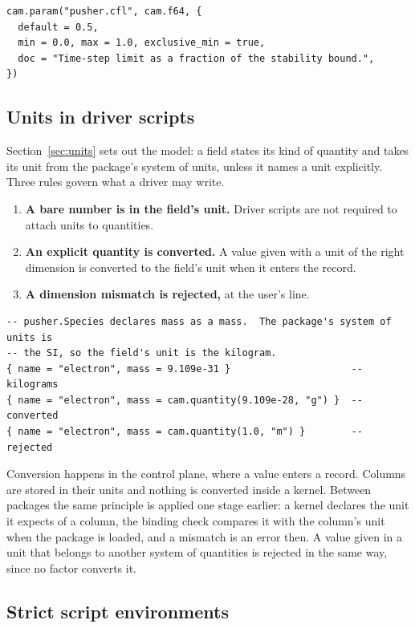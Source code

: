 \documentclass[11pt,a4paper]{article}
\begin{document}
\begin{lstlisting}[language={[5.3]Lua}]
cam.param("pusher.cfl", cam.f64, {
  default = 0.5,
  min = 0.0, max = 1.0, exclusive_min = true,
  doc = "Time-step limit as a fraction of the stability bound.",
})
\end{lstlisting}

\subsection{Units in driver scripts}

Section~\ref{sec:units} sets out the model: a field states its kind of
quantity and takes its unit from the package's system of units, unless it
names a unit explicitly.  Three rules govern what a driver may write.

\begin{enumerate}
  \item \textbf{A bare number is in the field's unit.}  Driver scripts are
        not required to attach units to quantities.
  \item \textbf{An explicit quantity is converted.}  A value given with a
        unit of the right dimension is converted to the field's unit when
        it enters the record.
  \item \textbf{A dimension mismatch is rejected,} at the user's line.
\end{enumerate}

\begin{lstlisting}[language={[5.3]Lua}]
-- pusher.Species declares mass as a mass.  The package's system of units is
-- the SI, so the field's unit is the kilogram.
{ name = "electron", mass = 9.109e-31 }                     -- kilograms
{ name = "electron", mass = cam.quantity(9.109e-28, "g") }  -- converted
{ name = "electron", mass = cam.quantity(1.0, "m") }        -- rejected
\end{lstlisting}

Conversion happens in the control plane, where a value enters a record.
Columns are stored in their units and nothing is converted inside a kernel.
Between packages the same principle is applied one stage earlier: a kernel
declares the unit it expects of a column, the binding check compares it
with the column's unit when the package is loaded, and a mismatch is an
error then.  A value given in a unit that belongs to another system of
quantities is rejected in the same way, since no factor converts it.

\subsection{Strict script environments}
\label{sec:strict}
\end{document}

